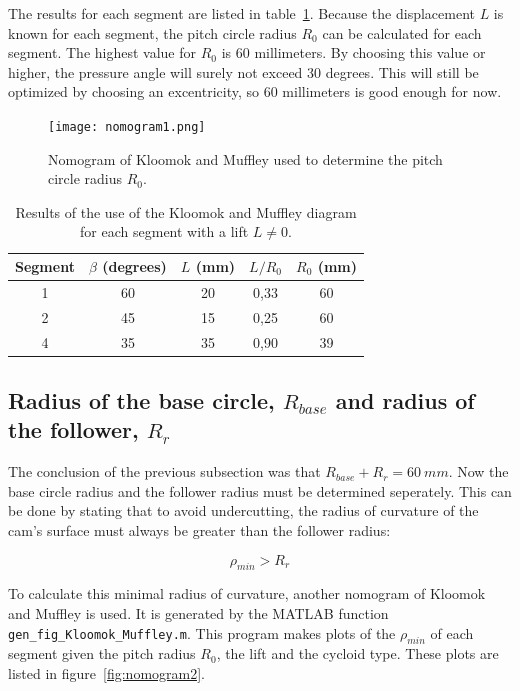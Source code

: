 \documentclass[a4paper]{article}
\begin{document}
The results for each segment are listed in table~\ref{tab:nomogram}. Because the displacement \(L\) is known for each segment, the pitch circle radius \(R_0\) can be calculated for each segment. The highest value for \(R_0\) is 60 millimeters. By choosing this value or higher, the pressure angle will surely not exceed 30 degrees. This will still be optimized by choosing an excentricity, so 60 millimeters is good enough for now.

\begin{figure}
	\centering
	\texttt{[image: nomogram1.png]}
	\caption{Nomogram of Kloomok and Muffley used to determine the pitch circle radius \(R_0\).}
	\label{fig:nomogram1}
\end{figure}

\begin{table}
	\centering
	\begin{tabular}{c|cccc}
		Segment & \(\beta\) (degrees) & \(L\) (mm) & \(L/R_0\) & \(R_0\) (mm) \\
		\hline
		1 & 60 & 20 & 0,33 & 60 \\
		2 & 45 & 15 & 0,25 & 60\\
		4 & 35 & 35 & 0,90 & 39\\
	\end{tabular}
	\caption{Results of the use of the Kloomok and Muffley diagram for each segment with a lift \(L\neq0\).}
	\label{tab:nomogram}
\end{table}

\subsection{Radius of the base circle, \(R_{base}\) and radius of the follower, \(R_r\)}

The conclusion of the previous subsection was that \(R_{base}+R_r=60~mm\). Now the base circle radius and the follower radius must be determined seperately. This can be done by stating that to avoid undercutting, the radius of curvature of the cam's surface must always be greater than the follower radius:

\begin{equation}
	\rho _{min} > R_r
\end{equation}

To calculate this minimal radius of curvature, another nomogram of Kloomok and Muffley is used. It is generated by the MATLAB function \texttt{gen\_fig\_Kloomok\_Muffley.m}. This program makes plots of the \(\rho_{min}\) of each segment given the pitch radius \(R_0\), the lift and the cycloid type. These plots are listed in figure~\ref{fig:nomogram2}.
\end{document}
